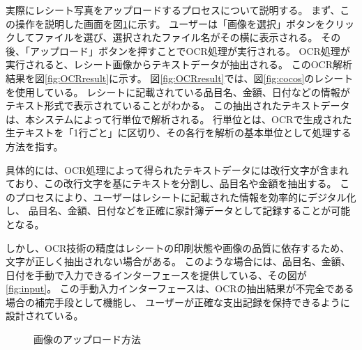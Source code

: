 \documentclass[main]{subfiles}
\begin{document}

実際にレシート写真をアップロードするプロセスについて説明する。
まず、この操作を説明した画面を図\ref{fig:upload}に示す。
ユーザーは「画像を選択」ボタンをクリックしてファイルを選び、選択されたファイル名がその横に表示される。
その後、「アップロード」ボタンを押すことでOCR処理が実行される。
OCR処理が実行されると、レシート画像からテキストデータが抽出される。
このOCR解析結果を図\ref{fig:OCRresult}に示す。
図\ref{fig:OCRresult}では、図\ref{fig:cocos}のレシートを使用している。
レシートに記載されている品目名、金額、日付などの情報がテキスト形式で表示されていることがわかる。
この抽出されたテキストデータは、本システムによって行単位で解析される。
行単位とは、OCRで生成された生テキストを「1行ごと」に区切り、その各行を解析の基本単位として処理する方法を指す。

具体的には、OCR処理によって得られたテキストデータには改行文字が含まれており、この改行文字を基にテキストを分割し、品目名や金額を抽出する。
このプロセスにより、ユーザーはレシートに記載された情報を効率的にデジタル化し、
品目名、金額、日付などを正確に家計簿データとして記録することが可能となる。

しかし、OCR技術の精度はレシートの印刷状態や画像の品質に依存するため、文字が正しく抽出されない場合がある。
このような場合には、品目名、金額、日付を手動で入力できるインターフェースを提供している、その図が\ref{fig:input}。
この手動入力インターフェースは、OCRの抽出結果が不完全である場合の補完手段として機能し、
ユーザーが正確な支出記録を保持できるように設計されている。

\begin{figure}[tb]
    \begin{center}
        \caption{画像のアップロード方法}
        \label{fig:upload}
    \end{center}
\end{figure}
\end{document}
